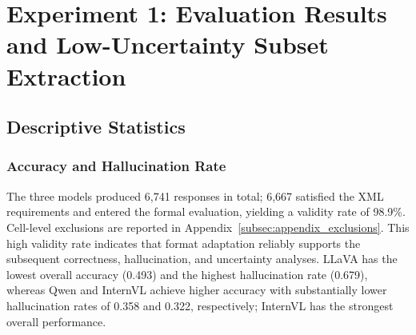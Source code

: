 \section{Experiment 1: Evaluation Results and Low-Uncertainty Subset Extraction}
\label{sec:experiment1_results}

\subsection{Descriptive Statistics}
\label{subsec:descriptive_statistics}

\subsubsection{Accuracy and Hallucination Rate}

The three models produced 6,741 responses in total; 6,667 satisfied the XML requirements and entered the formal evaluation, yielding a validity rate of 98.9\%. Cell-level exclusions are reported in Appendix~\ref{subsec:appendix_exclusions}. This high validity rate indicates that format adaptation reliably supports the subsequent correctness, hallucination, and uncertainty analyses. LLaVA has the lowest overall accuracy (0.493) and the highest hallucination rate (0.679), whereas Qwen and InternVL achieve higher accuracy with substantially lower hallucination rates of 0.358 and 0.322, respectively; InternVL has the strongest overall performance.

